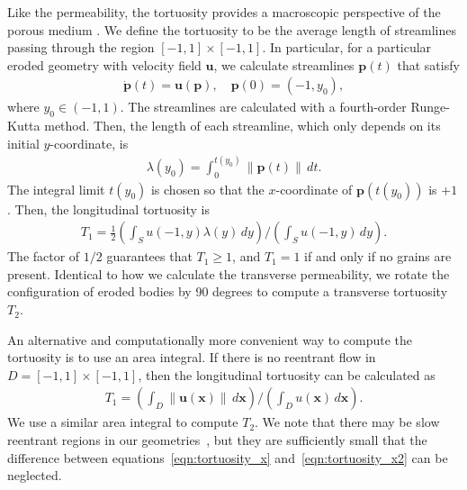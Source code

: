 \documentclass[3p]{elsarticle}
\newcommand{\pp}{{\mathbf{p}}}
\newcommand{\uu}{{\mathbf{u}}}
\newcommand{\xx}{{\mathbf{x}}}
\newcommand{\anis}{\mathcal{A}}
\newcommand{\anistort}{\mathcal{A_T}}
\begin{document}
Like the permeability, the tortuosity provides a macroscopic perspective
of the porous medium \cite{souzy2020velocity}. We define the tortuosity to be the average length
of streamlines passing through the region $[-1,1] \times [-1,1]$. In
particular, for a particular eroded geometry with velocity field $\uu$,
we calculate streamlines $\pp(t)$ that satisfy
\begin{align}
  \dot{\pp}(t) = \uu(\pp), \quad \pp(0) = (-1,y_0),
\end{align}
where $y_0 \in (-1,1)$. The streamlines are calculated with a fourth-order Runge-Kutta method. Then, the length of each streamline, which only depends on its initial $y$-coordinate, is
\begin{align}
  \lambda(y_0) = \int_{0}^{t(y_0)} \|\pp(t)\| \,dt.
\end{align}
The integral limit $t(y_0)$ is chosen so that the $x$-coordinate of
$\pp(t(y_0))$ is $+1$. Then, the longitudinal tortuosity is
\begin{align}
  T_1 = \frac{1}{2}\left(\int_{S}u(-1,y)\lambda(y)\,dy \right)
  \Bigg/
  \left(\int_{S}u(-1,y)\,dy \right).
  \label{eqn:tortuosity_x}
\end{align} 
The factor of $1/2$ guarantees that $T_1 \geq 1$, and $T_1 = 1$ if and only if no grains are present. Identical to how we calculate the transverse permeability, we rotate the configuration of eroded bodies by 90 degrees to compute a transverse tortuosity $T_2$.


An alternative and computationally more convenient way to compute the tortuosity is to use an area integral. If there is no reentrant flow in $D = [-1,1] \times [-1,1]$, then the longitudinal tortuosity can be calculated as~\citep{dud-koz-mat2011}
\begin{align}
  T_1 = \left(\int_D \|\uu(\xx)\|\, d\xx \right) \Bigg/
      \left(\int_D u(\xx)\, d\xx \right).
  \label{eqn:tortuosity_x2}
\end{align}
We use a similar area integral to compute $T_2$. We note that there may be slow reentrant regions in our geometries~\cite{chiu2020viscous}, but they are sufficiently small that the difference between equations~\eqref{eqn:tortuosity_x} and~\eqref{eqn:tortuosity_x2} can be neglected.
\end{document}
